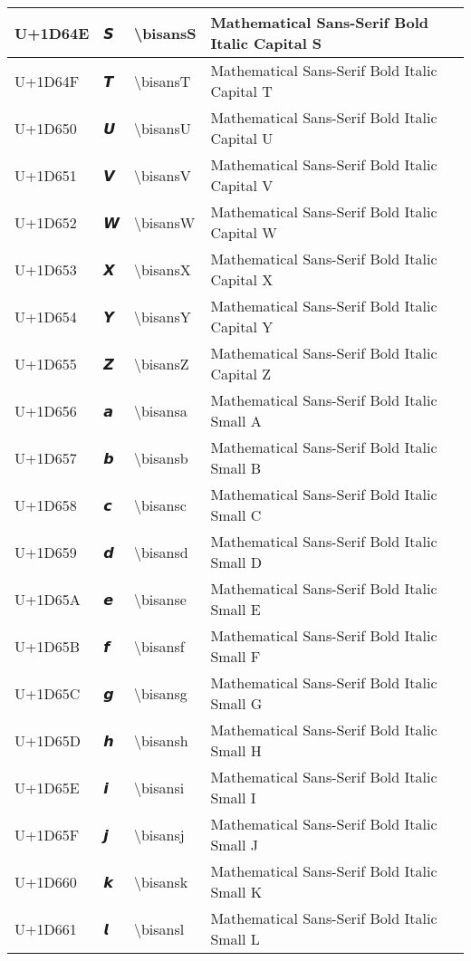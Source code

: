 \begin{table}[h]
\begin{tabulary}{\linewidth}{|L|L|L|L|}
\hline
U+1D64E & 𝙎 & {\textbackslash}bisansS & Mathematical Sans-Serif Bold Italic Capital S \\
\hline
U+1D64F & 𝙏 & {\textbackslash}bisansT & Mathematical Sans-Serif Bold Italic Capital T \\
\hline
U+1D650 & 𝙐 & {\textbackslash}bisansU & Mathematical Sans-Serif Bold Italic Capital U \\
\hline
U+1D651 & 𝙑 & {\textbackslash}bisansV & Mathematical Sans-Serif Bold Italic Capital V \\
\hline
U+1D652 & 𝙒 & {\textbackslash}bisansW & Mathematical Sans-Serif Bold Italic Capital W \\
\hline
U+1D653 & 𝙓 & {\textbackslash}bisansX & Mathematical Sans-Serif Bold Italic Capital X \\
\hline
U+1D654 & 𝙔 & {\textbackslash}bisansY & Mathematical Sans-Serif Bold Italic Capital Y \\
\hline
U+1D655 & 𝙕 & {\textbackslash}bisansZ & Mathematical Sans-Serif Bold Italic Capital Z \\
\hline
U+1D656 & 𝙖 & {\textbackslash}bisansa & Mathematical Sans-Serif Bold Italic Small A \\
\hline
U+1D657 & 𝙗 & {\textbackslash}bisansb & Mathematical Sans-Serif Bold Italic Small B \\
\hline
U+1D658 & 𝙘 & {\textbackslash}bisansc & Mathematical Sans-Serif Bold Italic Small C \\
\hline
U+1D659 & 𝙙 & {\textbackslash}bisansd & Mathematical Sans-Serif Bold Italic Small D \\
\hline
U+1D65A & 𝙚 & {\textbackslash}bisanse & Mathematical Sans-Serif Bold Italic Small E \\
\hline
U+1D65B & 𝙛 & {\textbackslash}bisansf & Mathematical Sans-Serif Bold Italic Small F \\
\hline
U+1D65C & 𝙜 & {\textbackslash}bisansg & Mathematical Sans-Serif Bold Italic Small G \\
\hline
U+1D65D & 𝙝 & {\textbackslash}bisansh & Mathematical Sans-Serif Bold Italic Small H \\
\hline
U+1D65E & 𝙞 & {\textbackslash}bisansi & Mathematical Sans-Serif Bold Italic Small I \\
\hline
U+1D65F & 𝙟 & {\textbackslash}bisansj & Mathematical Sans-Serif Bold Italic Small J \\
\hline
U+1D660 & 𝙠 & {\textbackslash}bisansk & Mathematical Sans-Serif Bold Italic Small K \\
\hline
U+1D661 & 𝙡 & {\textbackslash}bisansl & Mathematical Sans-Serif Bold Italic Small L \\

\end{tabulary}
\end{table}
